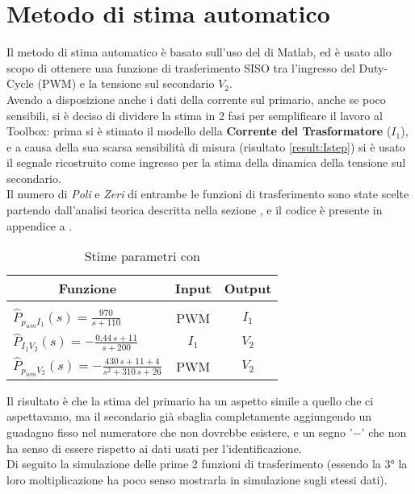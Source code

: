 \section{Metodo di stima automatico}
Il metodo di stima automatico è basato sull'uso del \cite*{IdentificationToolbox} di Matlab, ed è usato allo scopo di ottenere una funzione di trasferimento SISO tra l'ingresso del Duty-Cycle (PWM) e la tensione sul secondario $ V_2 $.\\
Avendo a disposizione anche i dati della corrente sul primario, anche se poco sensibili, si è deciso di dividere la stima in 2 fasi per semplificare il lavoro al Toolbox: prima si è stimato il modello della \textbf{Corrente del Trasformatore} ($ I_1 $), e a causa della sua scarsa sensibilità di misura (risultato \ref{result:Istep}) si è usato il segnale ricostruito come ingresso per la stima della dinamica della tensione sul secondario.\\
Il numero di \textit{Poli} e \textit{Zeri} di entrambe le funzioni di trasferimento sono state scelte partendo dall'analisi teorica descritta nella sezione , e il codice è presente in appendice a .

\begin{table}[H]
	\centering
	\caption[Stime parametri con \cite*{IdentificationToolbox}]{Stime parametri con \cite*{IdentificationToolbox}}		\label{tab:stimaAutomaticaParametri}
	\vspace{1mm}
	\begin{tabular}[t]{||l|c|c||}
		\hline
		\multicolumn{1}{||c}{\textbf{Funzione}}            & \multicolumn{1}{|c}{\textbf{Input}} & \multicolumn{1}{|c||}{\textbf{Output}} \\
		\hline\hline
		                                                   &                                     &                                       \\[-3mm]
		$\hat{P}_{p_{wm} I_1}(s) = \frac{970}{s+110}$      & PWM                                 & $I_1$                                 \\[3mm]

		$\hat{P}_{I_1 V_2}(s) = -\frac{0.44\,s+11}{s+200}$ & $I_1$                               & $V_2$                                 \\[3mm]

		$\hat{P}_{p_{wm} V_2}(s) = -\frac{430\,s+11+4}{s^2+310\,s+26}$
		                                                   & PWM                                 & $ V_2 $                               \\
		\hline
	\end{tabular}
\end{table}
\noindent
Il risultato è che la stima del primario ha un aspetto simile a quello che ci aspettavamo, ma il secondario già sbaglia completamente aggiungendo un guadagno fisso nel numeratore che non dovrebbe esistere, e un segno '$ - $' che non ha senso di essere rispetto ai dati usati per l'identificazione.\\
Di seguito la simulazione delle prime 2 funzioni di trasferimento (essendo la 3° la loro moltiplicazione ha poco senso mostrarla in simulazione sugli stessi dati).

